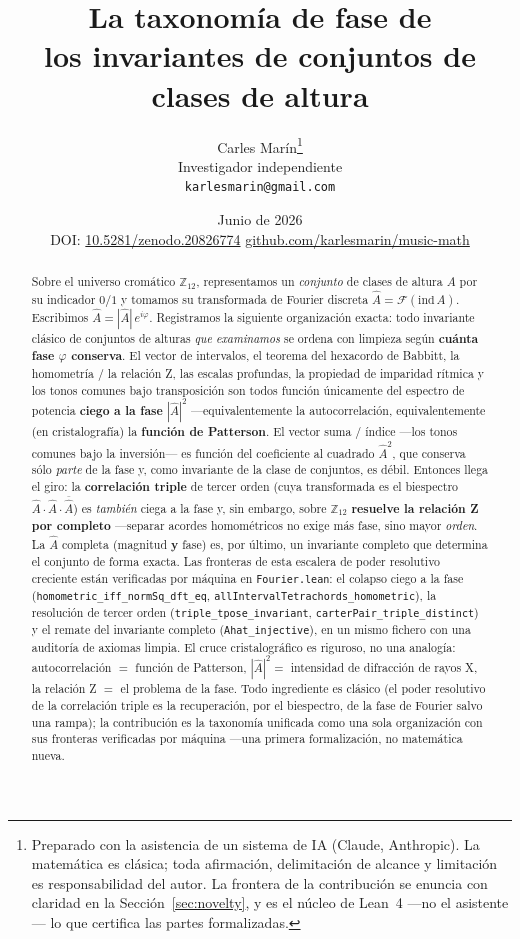 \documentclass[11pt]{article}
\title{\bf La taxonomía de fase de\\ los invariantes de conjuntos de clases de altura}
\author{Carles Mar\'in\thanks{Preparado con la asistencia de un sistema de IA (Claude, Anthropic).
La matemática es clásica; toda afirmación, delimitación de alcance y limitación es responsabilidad del
autor. La frontera de la contribución se enuncia con claridad en la Sección~\ref{sec:novelty}, y es el
núcleo de Lean~4 ---no el asistente--- lo que certifica las partes formalizadas.}\\[3pt]
  \normalsize Investigador independiente\\
  \normalsize \texttt{karlesmarin@gmail.com}}
\date{Junio de 2026\\[3pt]\normalsize DOI: \href{https://doi.org/10.5281/zenodo.20826774}{10.5281/zenodo.20826774}
\quad\textbullet\quad \href{https://github.com/karlesmarin/music-math}{github.com/karlesmarin/music-math}}
\newcommand{\lean}[1]{\texttt{#1}}
\newcommand{\Ztwelve}{\mathbb{Z}_{12}}
\newcommand{\Ahat}{\hat{A}}
\begin{document}
\maketitle

\begin{abstract}\noindent
Sobre el universo cromático $\Ztwelve$, representamos un \emph{conjunto} de clases de altura $A$ por su
indicador $0/1$ y tomamos su transformada de Fourier discreta
$\Ahat=\mathcal{F}(\mathrm{ind}\,A)$. Escribimos $\Ahat=|\Ahat|\,e^{i\varphi}$. Registramos la siguiente
organización exacta: todo invariante clásico de conjuntos de alturas \emph{que examinamos} se ordena con
limpieza según \textbf{cuánta fase $\varphi$ conserva}. El vector de intervalos, el teorema del hexacordo
de Babbitt, la homometría / la relación Z, las escalas profundas, la propiedad de imparidad rítmica y los
tonos comunes bajo transposición son todos función únicamente del espectro de potencia \textbf{ciego a la
fase} $|\Ahat|^2$ ---equivalentemente la autocorrelación, equivalentemente (en cristalografía) la
\textbf{función de Patterson}. El vector suma / índice ---los tonos comunes bajo la inversión--- es
función del coeficiente al cuadrado $\Ahat^2$, que conserva sólo \emph{parte} de la fase y, como invariante
de la clase de conjuntos, es débil. Entonces llega el giro: la \textbf{correlación triple} de tercer orden
(cuya transformada es el biespectro $\Ahat\cdot\Ahat\cdot\overline{\Ahat}$) es \emph{también} ciega a la
fase y, sin embargo, sobre $\Ztwelve$ \textbf{resuelve la relación Z por completo} ---separar acordes
homométricos no exige más fase, sino mayor \emph{orden}. La $\Ahat$ completa (magnitud \textbf{y} fase) es,
por último, un invariante completo que determina el conjunto de forma exacta. Las fronteras de esta
escalera de poder resolutivo creciente están verificadas por máquina en \lean{Fourier.lean}: el colapso
ciego a la fase (\lean{homometric\_iff\_normSq\_dft\_eq}, \lean{allIntervalTetrachords\_homometric}), la
resolución de tercer orden (\lean{triple\_tpose\_invariant}, \lean{carterPair\_triple\_distinct}) y el
remate del invariante completo (\lean{Ahat\_injective}), en un mismo fichero con una auditoría de axiomas
limpia. El cruce cristalográfico es riguroso, no una analogía: autocorrelación $=$ función de Patterson,
$|\Ahat|^2 =$ intensidad de difracción de rayos X, la relación Z $=$ el problema de la fase. Todo
ingrediente es clásico (el poder resolutivo de la correlación triple es la recuperación, por el biespectro,
de la fase de Fourier salvo una rampa); la contribución es la taxonomía unificada como una sola
organización con sus fronteras verificadas por máquina ---una primera formalización, no matemática nueva.
\end{abstract}
\end{document}
